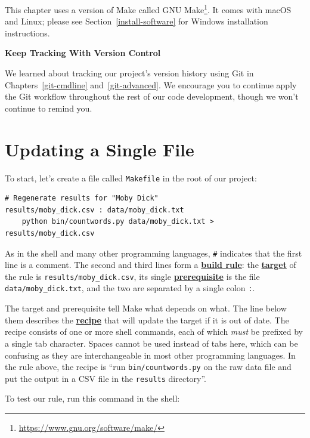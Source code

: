\documentclass[
]{krantz}
\renewenvironment{quote}{\begin{VF}}{\end{VF}}
\renewcommand{\href}[2]{#2\footnote{\url{#1}}}
\newcommand{\gref}[2]{\hyperlink{#2}{\textbf{#1}}}
\begin{document}
This chapter uses a version of Make called \href{https://www.gnu.org/software/make/}{GNU Make}.
It comes with macOS and Linux;
please see Section~\ref{install-software} for Windows installation instructions.

\begin{quote}
\textbf{Keep Tracking With Version Control}

We learned about tracking our project's version history using Git
in Chapters~\ref{git-cmdline} and~\ref{git-advanced}.
We encourage you to continue apply the Git workflow
throughout the rest of our code development,
though we won't continue to remind you.
\end{quote}

\hypertarget{automate-single-file}{%
\section{Updating a Single File}\label{automate-single-file}}

To start,
let's create a file called \texttt{Makefile} in the root of our project:

\begin{verbatim}
# Regenerate results for "Moby Dick"
results/moby_dick.csv : data/moby_dick.txt
    python bin/countwords.py data/moby_dick.txt > results/moby_dick.csv
\end{verbatim}

As in the shell and many other programming languages,
\texttt{\#} indicates that the first line is a comment.
The second and third lines form a \gref{build rule}{build\_rule}:
the \gref{target}{build\_target} of the rule is \texttt{results/moby\_dick.csv},
its single \gref{prerequisite}{prerequisite} is the file \texttt{data/moby\_dick.txt},
and the two are separated by a single colon \texttt{:}.

The target and prerequisite tell Make what depends on what.
The line below them describes the \gref{recipe}{build\_recipe}
that will update the target if it is out of date.
The recipe consists of one or more shell commands,
each of which \emph{must} be prefixed by a single tab character.
Spaces cannot be used instead of tabs here,
which can be confusing as they are interchangeable in most other programming languages.
In the rule above,
the recipe is ``run \texttt{bin/countwords.py} on the raw data file
and put the output in a CSV file in the \texttt{results} directory''.

To test our rule, run this command in the shell:
\end{document}
